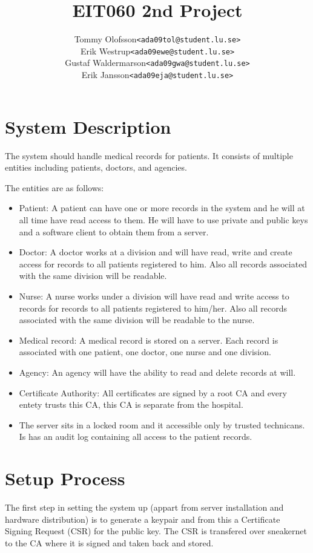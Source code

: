 \documentclass[10pt, a4paper]{article}
\title{EIT060 2nd Project}
\date{}
\author{
	\begin{tabular}{l l}
		Tommy Olofsson & \texttt{<ada09tol@student.lu.se>}\\
		Erik Westrup & \texttt{<ada09ewe@student.lu.se>}\\
		Gustaf Waldermarson & \texttt{<ada09gwa@student.lu.se>}\\
		Erik Jansson & \texttt{<ada09eja@student.lu.se>}
	\end{tabular}
}
\begin{document}
\begin{titlepage}
\maketitle
\begin{center}
\end{center}

\thispagestyle{empty}
\end{titlepage}
\setcounter{page}{2}
\section{System Description}
The system should handle medical records for patients. It consists of multiple entities including patients, doctors, and agencies. %

The entities are as follows:
\begin{itemize}
\item Patient: A patient can have one or more records in the system and he will at all time have read access to them. He will have to use private and public keys and a software client to obtain them from a server. 
\item Doctor: A doctor works at a division and will have read, write and create access for records to all patients registered to him. Also all records associated with the same division will be readable.
\item Nurse: A nurse works under a division will have read and write access to records for records to all patients registered to him/her. Also all records associated with the same division will be readable to the nurse.
\item Medical record: A medical record is stored on a server. Each record is associated with one patient, one doctor, one nurse and one division.
\item Agency: An agency will have the ability to read and delete records at will.
\item Certificate Authority: All certificates are signed by a root CA and every entety trusts this CA, this CA is
separate from the hospital.
\item The server sits in a locked room and it accessible only by trusted technicans. Is has an audit log containing all access to the patient records.
\end{itemize}

\section{Setup Process}
The first step in setting the system up (appart from server installation and hardware distribution) is to generate a keypair and from this a Certificate Signing Request (CSR) for the public key. The CSR is transfered over sneakernet to the CA where it is signed and taken back and stored. 
\end{document}
